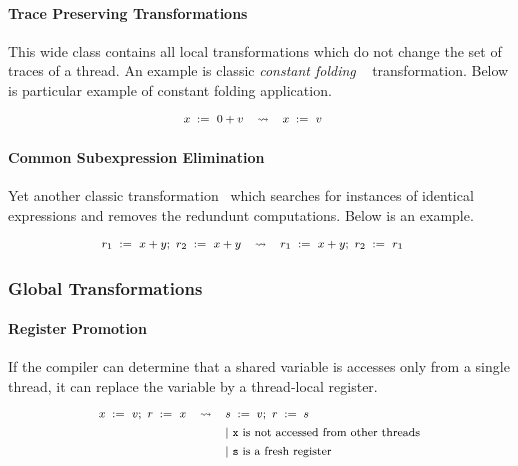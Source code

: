 \paragraph{Trace Preserving Transformations}

This wide class contains all local transformations 
which do not change the set of traces of a thread. 
An example is classic \emph{constant folding}%
~\cite{Muchnick:ACDI97, Wegman-Zadeck:TOPLAS91} transformation.
Below is particular example of constant folding application.
%
\[\def\arraystretch{1.4}\footnotesize
  \begin{array}{cccl} 

      \writeInst{}{x}{0 + v} 
    & \leadsto 
    & \writeInst{}{x}{v}
    & \\ 

  \end{array}
\]
  
\paragraph{Common Subexpression Elimination}

Yet another classic transformation~\cite{Muchnick:ACDI97} 
which searches for instances of identical expressions 
and removes the redundunt computations. 
Below is an example. 
%
\[\def\arraystretch{1.4}\footnotesize
  \begin{array}{cccl} 

      \readInst{}{r_1}{x + y} \seq \readInst{}{r_2}{x + y} 
    & \leadsto 
    & \readInst{}{r_1}{x + y} \seq \readInst{}{r_2}{r_1}
    & \\ 

  \end{array}
\]

\subsubsection{Global Transformations}

\paragraph{Register Promotion}

If the compiler can determine that a shared variable 
is accesses only from a single thread, it can replace 
the variable by a thread-local register. 
%
\[\def\arraystretch{1.4}\footnotesize
  \begin{array}{ccl} 

      \writeInst{}{x}{v} \seq \readInst{}{r}{x} 
    & \leadsto 
    & \assignInst{s}{v} \seq \assignInst{r}{s}
    \\ 
    
    & & |~ \text{\texttt{x} is not accessed from other threads} \\
    & & |~ \text{\texttt{s} is a fresh register} \\ 

  \end{array}
\]

